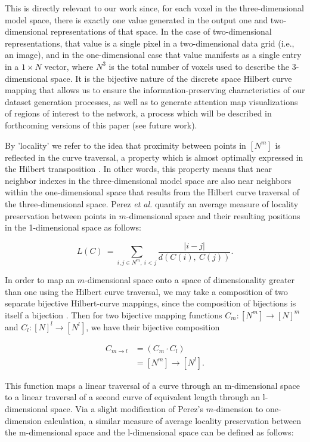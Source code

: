 \documentclass{article}
\begin{document}
This is directly relevant to our work since, for each voxel in the three-dimensional model space, there is exactly one value generated in the output one and two-dimensional representations of that space. In the case of two-dimensional representations, that value is a single pixel in a two-dimensional data grid (i.e., an image), and in the one-dimensional case that value manifests as a single entry in a $1 \times N$ vector, where $N^3$ is the total number of voxels used to describe the 3-dimensional space. It is the bijective nature of the discrete space Hilbert curve mapping that allows us to ensure the information-preserving characteristics of our dataset generation processes, as well as to generate attention map visualizations of regions of interest to the network, a process which will be described in forthcoming versions of this paper (see future work).  

By 'locality' we refer to the idea that proximity between points in $[N^m]$ is reflected in the curve traversal, a property which is almost optimally expressed in the Hilbert transposition \cite{lindenbaum96}. In other words, this property means that near neighbor indexes in the three-dimensional model space are also near neighbors within the one-dimensional space that results from the Hilbert curve traversal of the three-dimensional space. Perez \textit{et al.} quantify an average measure of locality preservation between points in $m$-dimensional space and their resulting positions in the 1-dimensional space as follows:

\begin{equation}
    L(C)\ = \sum_{i,j \in N^m,\ i<j}^{} \frac{|i-j|}{d(C(i),\ C(j))}.
\end{equation}

In order to map an $m$-dimensional space onto a space of dimensionality greater than one using the Hilbert curve traversal, we may take a composition of two separate bijective Hilbert-curve mappings, since the composition of bijections is itself a bijection \cite{BijectionLemma}. Then for two bijective mapping functions  $C_m:[N^m] \rightarrow [N]^m$ and $C_l:[N]^l \rightarrow [N^l]$, we have their bijective composition

\begin{align*}
    C_{m \rightarrow l}&=(C_m \cdot C_l)\\
    &=[N^m] \rightarrow [N^l].
\end{align*}

This function maps a linear traversal of a curve through an m-dimensional space to a linear traversal of a second curve of equivalent length through an l-dimensional space. Via a slight modification of Perez's $m$-dimension to one-dimension calculation, a similar measure of average locality preservation between the m-dimensional space and the l-dimensional space can be defined as follows:
\end{document}
